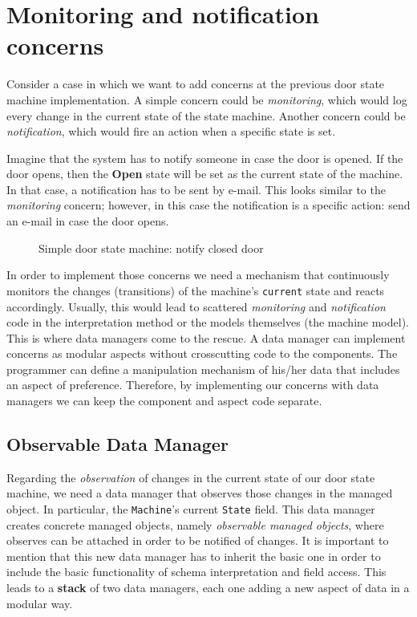 \section{Monitoring and notification concerns}
Consider a case in which we want to add concerns at the previous door state machine implementation.
A simple concern could be \textit{monitoring}, which would log every change in the current state of the state machine.
Another concern could be \textit{notification}, which would fire an action when a specific state is set.

Imagine that the system has to notify someone in case the door is opened.
If the door opens, then the \textbf{Open} state will be set as the current state of the machine.
In that case, a notification has to be sent by e-mail.
This looks similar to the \textit{monitoring} concern; however, in this case the notification is a specific action: send an e-mail in case the door opens.

\begin{figure}[H]
	\centering
  	\caption{Simple door state machine: notify closed door}
  	\label{fig:State_machine_danger}
\end{figure}

In order to implement those concerns we need a mechanism that continuously monitors the changes (transitions) of the machine's \texttt{current} state and reacts accordingly.
Usually, this would lead to scattered \textit{monitoring} and \textit{notification} code in the interpretation method or the models themselves (the machine model).
This is where data managers come to the rescue.
A data manager can implement concerns as modular aspects without crosscutting code to the components.
The programmer can define a manipulation mechanism of his/her data that includes an aspect of preference.
Therefore, by implementing our concerns with data managers we can keep the component and aspect code separate.

\subsection{Observable Data Manager}
Regarding the \textit{observation} of changes in the current state of our door state machine, we need a data manager that observes those changes in the managed object.
In particular, the \texttt{Machine}'s current \texttt{State} field.
This data manager creates concrete managed objects, namely \textit{observable managed objects}, where observes can be attached in order to be notified of changes.
It is important to mention that this new data manager has to inherit the basic one in order to include the basic functionality of schema interpretation and field access.
This leads to a \textbf{stack} of two data managers, each one adding a new aspect of data in a modular way.

